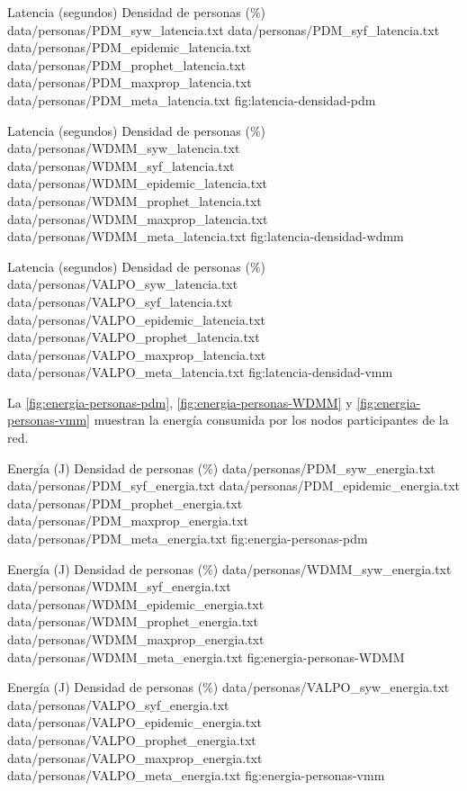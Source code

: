 {
\graficoProtocolos
{Latencia (segundos)}
{Densidad de personas (\%)}
{data/personas/PDM_syw_latencia.txt}
{data/personas/PDM_syf_latencia.txt}
{data/personas/PDM_epidemic_latencia.txt}
{data/personas/PDM_prophet_latencia.txt}
{data/personas/PDM_maxprop_latencia.txt}
{data/personas/PDM_meta_latencia.txt}
}{fig:latencia-densidad-pdm}


{
\graficoProtocolos
{Latencia (segundos)}
{Densidad de personas (\%)}
{data/personas/WDMM_syw_latencia.txt}
{data/personas/WDMM_syf_latencia.txt}
{data/personas/WDMM_epidemic_latencia.txt}
{data/personas/WDMM_prophet_latencia.txt}
{data/personas/WDMM_maxprop_latencia.txt}
{data/personas/WDMM_meta_latencia.txt}
}{fig:latencia-densidad-wdmm}


{
\graficoProtocolos
{Latencia (segundos)}
{Densidad de personas (\%)}
{data/personas/VALPO_syw_latencia.txt}
{data/personas/VALPO_syf_latencia.txt}
{data/personas/VALPO_epidemic_latencia.txt}
{data/personas/VALPO_prophet_latencia.txt}
{data/personas/VALPO_maxprop_latencia.txt}
{data/personas/VALPO_meta_latencia.txt}
}{fig:latencia-densidad-vmm}


La \ref{fig:energia-personas-pdm},
\ref{fig:energia-personas-WDMM} y 
\ref{fig:energia-personas-vmm} muestran la energía consumida por los nodos
participantes de la red.

{
\graficoProtocolos
{Energía (J)}
{Densidad de personas (\%)} 
{data/personas/PDM_syw_energia.txt}
{data/personas/PDM_syf_energia.txt}
{data/personas/PDM_epidemic_energia.txt}
{data/personas/PDM_prophet_energia.txt}
{data/personas/PDM_maxprop_energia.txt}
{data/personas/PDM_meta_energia.txt}
}{fig:energia-personas-pdm}



{
\graficoProtocolos
{Energía (J)}
{Densidad de personas (\%)}
{data/personas/WDMM_syw_energia.txt}
{data/personas/WDMM_syf_energia.txt}
{data/personas/WDMM_epidemic_energia.txt}
{data/personas/WDMM_prophet_energia.txt}
{data/personas/WDMM_maxprop_energia.txt}
{data/personas/WDMM_meta_energia.txt}
}{fig:energia-personas-WDMM}



{
\graficoProtocolos
{Energía (J)}
{Densidad de personas (\%)}
{data/personas/VALPO_syw_energia.txt}
{data/personas/VALPO_syf_energia.txt}
{data/personas/VALPO_epidemic_energia.txt}
{data/personas/VALPO_prophet_energia.txt}
{data/personas/VALPO_maxprop_energia.txt}
{data/personas/VALPO_meta_energia.txt}
}{fig:energia-personas-vmm}



